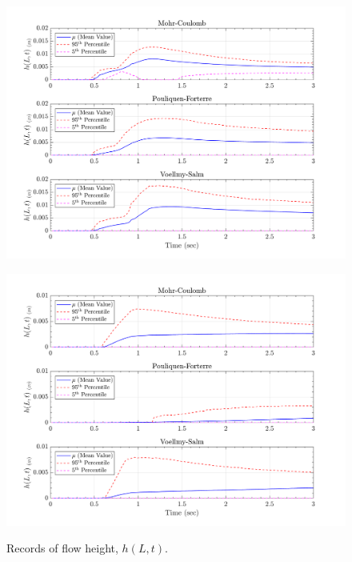 \documentclass{article}
\begin{document}
\begin{figure}[H]
	\begin{minipage}[b]{0.5\linewidth}
    	\centering
    	\includegraphics[width=1\textwidth]{InclinedPlane/LocalRecords/Records/H_L15.png}
    	\label{fig:Ramp-L3-H}
	\end{minipage}
	\begin{minipage}[b]{0.5\linewidth}
		\centering
		\includegraphics[width=1\textwidth]{InclinedPlane/LocalRecords/Records/H_L17.png}
    	\label{fig:Ramp-L4-H}
    \end{minipage}
    \caption{Records of flow height, $h(L,t)$.}
    \label{fig:Ramp-LM-H}    
\end{figure}
\end{document}
